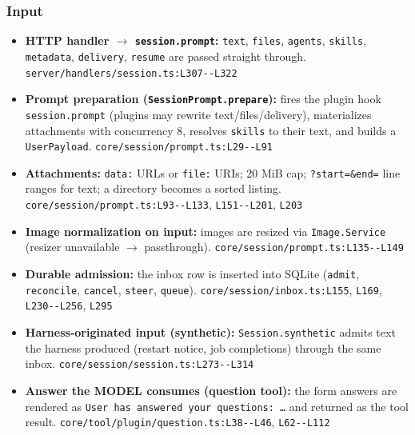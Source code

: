 \subsubsection*{Input}
\begin{itemize}
\item \textbf{HTTP handler $\rightarrow$ \texttt{session.\allowbreak{}prompt}:} \texttt{text}, \texttt{files}, \texttt{agents}, \texttt{skills}, \texttt{metadata}, \texttt{delivery}, \texttt{resume} are passed straight through. \texttt{server/\allowbreak{}handlers/\allowbreak{}session.\allowbreak{}ts:\allowbreak{}L307-\allowbreak{}-\allowbreak{}L322}
\item \textbf{Prompt preparation (\texttt{SessionPrompt.\allowbreak{}prepare}):} fires the plugin hook \texttt{session.\allowbreak{}prompt} (plugins may rewrite text/files/delivery), materializes attachments with concurrency 8, resolves \texttt{skills} to their text, and builds a \texttt{UserPayload}. \texttt{core/\allowbreak{}session/\allowbreak{}prompt.\allowbreak{}ts:\allowbreak{}L29-\allowbreak{}-\allowbreak{}L91}
\item \textbf{Attachments:} \texttt{data:\allowbreak{}} URLs or \texttt{file:\allowbreak{}} URIs; 20 MiB cap; \texttt{?start=\&end=} line ranges for text; a directory becomes a sorted listing. \texttt{core/\allowbreak{}session/\allowbreak{}prompt.\allowbreak{}ts:\allowbreak{}L93-\allowbreak{}-\allowbreak{}L133}, \texttt{L151-\allowbreak{}-\allowbreak{}L201}, \texttt{L203}
\item \textbf{Image normalization on input:} images are resized via \texttt{Image.\allowbreak{}Service} (resizer unavailable $\rightarrow$ passthrough). \texttt{core/\allowbreak{}session/\allowbreak{}prompt.\allowbreak{}ts:\allowbreak{}L135-\allowbreak{}-\allowbreak{}L149}
\item \textbf{Durable admission:} the inbox row is inserted into SQLite (\texttt{admit}, \texttt{reconcile}, \texttt{cancel}, \texttt{steer}, \texttt{queue}). \texttt{core/\allowbreak{}session/\allowbreak{}inbox.\allowbreak{}ts:\allowbreak{}L155}, \texttt{L169}, \texttt{L230-\allowbreak{}-\allowbreak{}L256}, \texttt{L295}
\item \textbf{Harness-originated input (synthetic):} \texttt{Session.\allowbreak{}synthetic} admits text the harness produced (restart notice, job completions) through the same inbox. \texttt{core/\allowbreak{}session/\allowbreak{}session.\allowbreak{}ts:\allowbreak{}L273-\allowbreak{}-\allowbreak{}L314}
\item \textbf{Answer the MODEL consumes (question tool):} the form answers are rendered as \texttt{User has answered your questions:\allowbreak{} \ldots{}} and returned as the tool result. \texttt{core/\allowbreak{}tool/\allowbreak{}plugin/\allowbreak{}question.\allowbreak{}ts:\allowbreak{}L38-\allowbreak{}-\allowbreak{}L46}, \texttt{L62-\allowbreak{}-\allowbreak{}L112}

\end{itemize}

